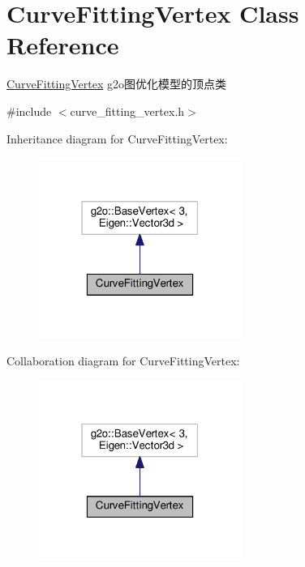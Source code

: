 \hypertarget{classCurveFittingVertex}{}\section{Curve\+Fitting\+Vertex Class Reference}
\label{classCurveFittingVertex}


\hyperlink{classCurveFittingVertex}{Curve\+Fitting\+Vertex} g2o图优化模型的顶点类  




{\ttfamily \#include $<$curve\+\_\+fitting\+\_\+vertex.\+h$>$}



Inheritance diagram for Curve\+Fitting\+Vertex\+:\nopagebreak
\begin{figure}[H]
\begin{center}
\leavevmode
\includegraphics[width=187pt]{classCurveFittingVertex__inherit__graph}
\end{center}
\end{figure}


Collaboration diagram for Curve\+Fitting\+Vertex\+:\nopagebreak
\begin{figure}[H]
\begin{center}
\leavevmode
\includegraphics[width=187pt]{classCurveFittingVertex__coll__graph}
\end{center}
\end{figure}
